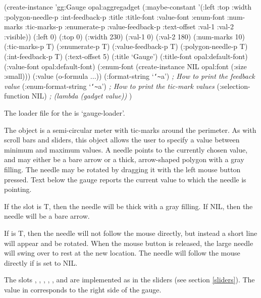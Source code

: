 
\begin{programexample}
\begin{group}
(create-instance 'gg:Gauge opal:aggregadget
   (:maybe-constant '(:left :top :width :polygon-needle-p :int-feedback-p
		      :title :title-font :value-font :enum-font :num-marks
		      :tic-marks-p :enumerate-p :value-feedback-p :text-offset
		      :val-1 :val-2 :visible))
   (:left 0)
   (:top 0)
   (:width 230)
   (:val-1 0)
   (:val-2 180)
   (:num-marks 10)
   (:tic-marks-p T)
   (:enumerate-p T)
   (:value-feedback-p T)
   (:polygon-needle-p T)
   (:int-feedback-p T)
   (:text-offset 5)
   (:title `Gauge')
   (:title-font opal:default-font)
   (:value-font opal:default-font)
   (:enum-font (create-instance NIL opal:font (:size :small)))
   (:value (o-formula ...))
   (:format-string `{\tt\char`\~}a')       {\it ; How to print the feedback value}
   (:enum-format-string `{\tt\char`\~}a')  {\it ; How to print the tic-mark values}
   (:selection-function NIL)   {\it ; (lambda (gadget value))}
   )
\end{group}
\end{programexample}

The loader file for the  is `gauge-loader'.

The  object is a semi-circular meter with tic-marks around
the perimeter.  As with scroll bars and sliders, this object allows
the user to specify a value between minimum and maximum values.  A
needle points to the currently chosen value, and may either be a bare
arrow or a thick, arrow-shaped polygon with a gray filling.  The
needle may be rotated by dragging it with the left mouse button
pressed.  Text below the gauge reports the current value to which the
needle is pointing.

If the slot  is T, then the needle will be thick
with a gray filling.  If NIL, then the needle will be a bare arrow.

If  is T, then the needle will not follow the
mouse directly, but instead a short line will appear and be rotated.
When the mouse button is released, the large needle will swing over to
rest at the new location.  The needle will follow the mouse directly
if  is set to NIL.

The slots , , , ,
, and  are implemented as in the sliders
(see section \ref{sliders}).  The value in  corresponds to
the right side of the gauge.

